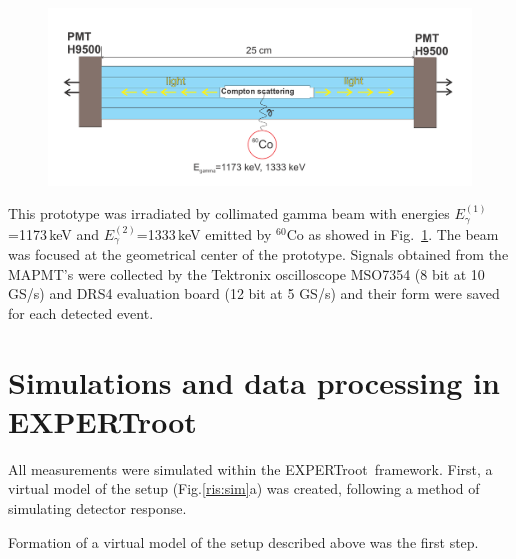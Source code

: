 \documentclass{webofc}
\newcommand{\er}{\textmd{EXPERTroot}}
\begin{document}
\begin{figure}[h]
	\centering
	\includegraphics[width=0.8\linewidth]{NeuRadexperiment.png}
	\label{ris:neuradexp}
\end{figure}

This prototype was irradiated by collimated gamma beam with energies $E^{(1)}_{\gamma}$=1173\,keV and $E^{(2)}_{\gamma}$=1333\,keV emitted by $^{60}$Co as showed in Fig.~\ref{ris:neuradexp}. The beam was focused at the geometrical center of the prototype. Signals obtained from the MAPMT's were collected by the Tektronix oscilloscope MSO7354 (8 bit at 10 GS/s) and DRS4 evaluation board (12 bit at 5 GS/s) and their form were saved for each detected event.

\section{Simulations and data processing in EXPERTroot}

All measurements were simulated within the \er\, framework. First, a virtual model of the setup (Fig.\ref{ris:sim}a) was created, following a method of simulating detector response. 


Formation of a virtual model of the setup described above was the first step.
	
\end{document}
